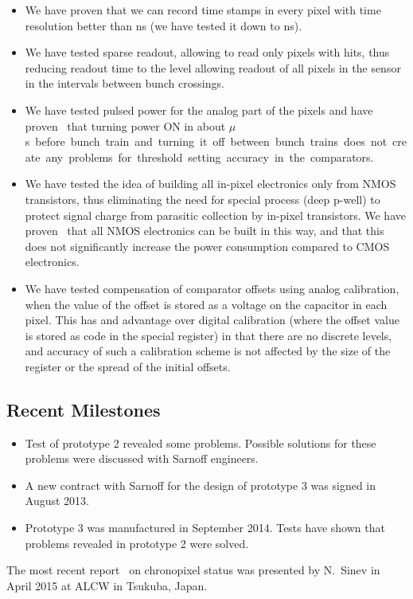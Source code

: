 \begin{itemize}
    \item We have proven that we can record time stamps in every pixel with time resolution better than \unit[300]{ns} (we have tested it down to \unit[150]{ns}).
    \item We have tested sparse readout, allowing to read only pixels with hits, thus reducing readout time to the level allowing readout of all pixels in the sensor in the intervals between bunch crossings.
    \item We have tested pulsed power for the analog part of the pixels and have proven~\cite{sinev:Chronopix:FirstPrototype} that turning power ON in about \unit[100]{$\mu$s} before bunch train and turning it off between bunch trains does not create any problems for threshold setting accuracy in the comparators.
    \item We have tested the idea of building all in-pixel electronics only from NMOS transistors, thus eliminating the need for special process (deep p-well) to protect signal charge from parasitic collection by in-pixel transistors. We have proven~\cite{sinev:Chronopixel:RnDstatus2013} that all NMOS electronics can be built in this way, and that this does not significantly increase the power consumption compared to CMOS electronics.
    \item We have tested compensation of comparator offsets using analog calibration, when the value of the offset is stored as a voltage on the capacitor in each pixel. This has and advantage over digital calibration (where the offset value is stored as code in the special register) in that there are no discrete levels, and accuracy of such a calibration scheme is not affected by the size of the register or the spread of the initial offsets.
\end{itemize}
\subsection{Recent Milestones}
\begin{itemize}
    \item Test of prototype 2 revealed some problems. Possible solutions for these problems were discussed with Sarnoff engineers.
    \item A new contract with Sarnoff for the design of prototype 3 was signed in August 2013.
    \item Prototype 3 was manufactured in September 2014. Tests have shown that problems revealed in prototype 2 were solved.
\end{itemize}
The most recent report~\cite{sinev:Chronopixel:status2014} on chronopixel status was presented by N.~Sinev in April 2015 at ALCW in Tsukuba, Japan.

